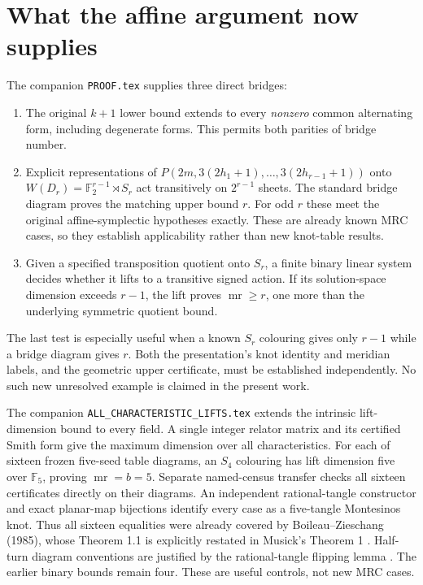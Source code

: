 \documentclass[11pt]{article}
\newcommand{\mr}{\operatorname{mr}}
\newcommand{\F}{\mathbb F}
\begin{document}
\section{What the affine argument now supplies}

The companion \texttt{PROOF.tex} supplies three direct bridges:
\begin{enumerate}
\item The original $k+1$ lower bound extends to every \emph{nonzero}
common alternating form, including degenerate forms. This permits both
parities of bridge number.
\item Explicit representations of
$P(2m,3(2h_1+1),\ldots,3(2h_{r-1}+1))$ onto
$W(D_r)=\F_2^{r-1}\rtimes S_r$ act transitively on $2^{r-1}$ sheets.
The standard bridge diagram proves the matching upper bound $r$.
For odd $r$ these meet the original affine-symplectic hypotheses exactly.
These are already known MRC cases, so they establish applicability rather
than new knot-table results.
\item Given a specified transposition quotient onto $S_r$, a finite
binary linear system decides whether it lifts to a transitive signed
action. If its solution-space dimension exceeds $r-1$, the lift proves
$\mr\ge r$, one more than the underlying symmetric quotient bound.
\end{enumerate}

The last test is especially useful when a known $S_r$ colouring gives only
$r-1$ while a bridge diagram gives $r$. Both the presentation's knot
identity and meridian labels, and the geometric upper certificate, must
be established independently. No such new unresolved example is claimed
in the present work.

The companion \texttt{ALL\_CHARACTERISTIC\_LIFTS.tex} extends the intrinsic
lift-dimension bound to every field. A single integer relator matrix and
its certified Smith form give the maximum dimension over all
characteristics. For each of sixteen frozen five-seed table diagrams,
an $S_4$ colouring has lift dimension five over $\F_5$, proving
$\mr=b=5$. Separate named-census transfer checks all sixteen certificates
directly on their diagrams. An independent rational-tangle constructor
and exact planar-map bijections identify every case as a five-tangle
Montesinos knot. Thus all sixteen equalities were already covered by
Boileau--Zieschang (1985), whose Theorem 1.1 is explicitly restated in
Musick's Theorem 1 \cite{musick}. Half-turn diagram conventions are
justified by the rational-tangle flipping lemma \cite{kl}. The earlier
binary bounds remain four. These are useful controls, not new MRC cases.
\end{document}
